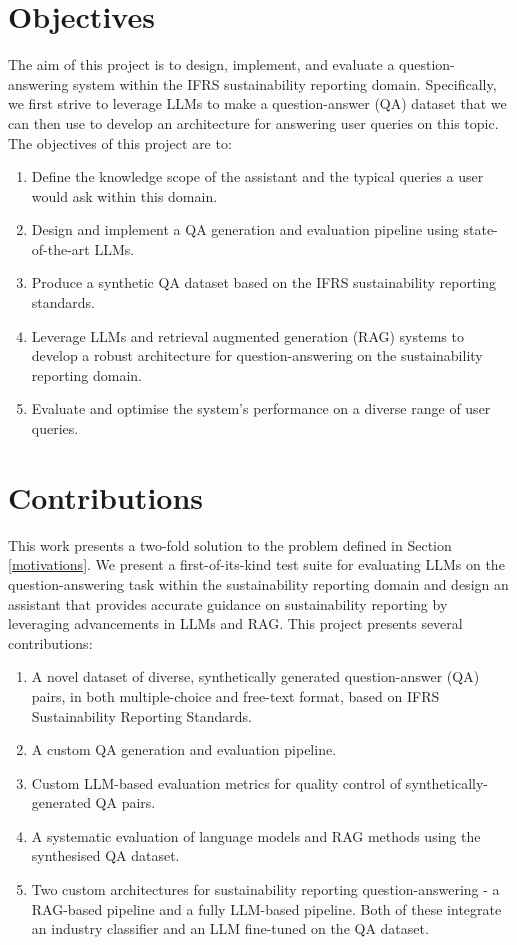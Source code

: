\section{Objectives}
The aim of this project is to design, implement, and evaluate a question-answering system within the IFRS sustainability reporting domain. Specifically, we first strive to leverage LLMs to make a question-answer (QA) dataset that we can then use to develop an architecture for answering user queries on this topic. The objectives of this project are to: 

\begin{enumerate}
    \item Define the knowledge scope of the assistant and the typical queries a user would ask within this domain.
    \item Design and implement a QA generation and evaluation pipeline using state-of-the-art LLMs.
    \item Produce a synthetic QA dataset based on the IFRS sustainability reporting standards.
    \item Leverage LLMs and retrieval augmented generation (RAG) systems to develop a robust architecture for question-answering on the sustainability reporting domain.
    \item Evaluate and optimise the system's performance on a diverse range of user queries.
\end{enumerate}

\section{Contributions}

This work presents a two-fold solution to the problem defined in Section \ref{motivations}. We present a first-of-its-kind test suite for evaluating LLMs on the question-answering task within the sustainability reporting domain and design an assistant that provides accurate guidance on sustainability reporting by leveraging advancements in LLMs and RAG. This project presents several contributions:
\begin{enumerate}
    \item A novel dataset of diverse, synthetically generated question-answer (QA) pairs, in both multiple-choice and free-text format, based on IFRS Sustainability Reporting Standards.
    \item A custom QA generation and evaluation pipeline.
    \item Custom LLM-based evaluation metrics for quality control of synthetically-generated QA pairs.
    \item A systematic evaluation of language models and RAG methods using the synthesised QA dataset.
    \item Two custom architectures for sustainability reporting question-answering - a RAG-based pipeline and a fully LLM-based pipeline. Both of these integrate an industry classifier and an LLM fine-tuned on the QA dataset.
\end{enumerate}





